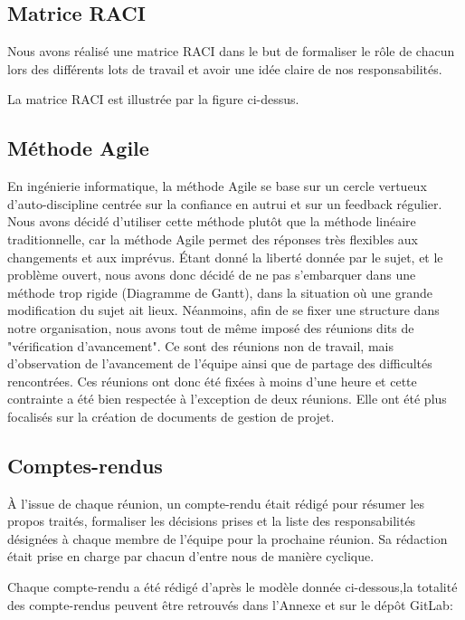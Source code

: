          
        
        \subsection{Matrice RACI}
        
        Nous avons réalisé une matrice RACI dans le but de formaliser le rôle de chacun lors des différents lots de travail et avoir une idée claire de nos responsabilités. 
        
        La matrice RACI est illustrée par la figure ci-dessus.
         
       \subsection{Méthode Agile}
       En ingénierie informatique, la méthode Agile se base sur un cercle vertueux d'auto-discipline centrée sur la confiance en autrui et sur un feedback régulier. Nous avons décidé d'utiliser cette méthode plutôt que la méthode linéaire traditionnelle, car la méthode Agile permet des réponses très flexibles aux changements et aux imprévus. Étant donné la liberté donnée par le sujet, et le problème ouvert, nous avons donc décidé de ne pas s'embarquer dans une méthode trop rigide (Diagramme de Gantt), dans la situation où une grande modification du sujet ait lieux. Néanmoins, afin de se fixer une structure dans notre organisation, nous avons tout de même imposé des réunions dits de "vérification d'avancement". Ce sont des réunions non de travail, mais d'observation de l'avancement de l'équipe ainsi que de partage des difficultés rencontrées. Ces réunions ont donc été fixées à moins d'une heure et cette contrainte a été bien respectée à l'exception de deux réunions. Elle ont été plus focalisés sur la création de documents de gestion de projet.
        \subsection{Comptes-rendus}
        
        À l’issue de chaque réunion, un compte-rendu était rédigé pour résumer les propos traités, formaliser les décisions prises et la liste des responsabilités désignées à chaque membre de l’équipe pour la prochaine réunion. Sa rédaction était prise en charge par chacun d’entre nous de manière cyclique.

Chaque compte-rendu a été rédigé d'après le modèle donnée ci-dessous,la totalité des compte-rendus peuvent être retrouvés dans l'Annexe et sur le dépôt GitLab:


